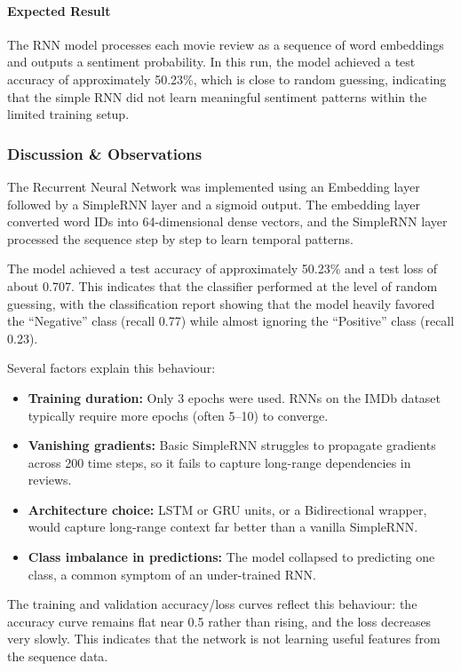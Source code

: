 \documentclass[a4paper,11pt]{article}
\begin{document}
\begin{itemize}
\paragraph{Expected Result}
The RNN model processes each movie review as a sequence of word embeddings and outputs a sentiment probability. In this run, the model achieved a test accuracy of approximately 50.23\%, which is close to random guessing, indicating that the simple RNN did not learn meaningful sentiment patterns within the limited training setup.

\subsubsection{Discussion \& Observations}

The Recurrent Neural Network was implemented using an Embedding layer followed by a SimpleRNN layer and a sigmoid output. The embedding layer converted word IDs into 64-dimensional dense vectors, and the SimpleRNN layer processed the sequence step by step to learn temporal patterns.

The model achieved a test accuracy of approximately 50.23\% and a test loss of about 0.707. This indicates that the classifier performed at the level of random guessing, with the classification report showing that the model heavily favored the ``Negative'' class (recall 0.77) while almost ignoring the ``Positive'' class (recall 0.23).

Several factors explain this behaviour:
\begin{itemize}
    \item \textbf{Training duration:} Only 3 epochs were used. RNNs on the IMDb dataset typically require more epochs (often 5--10) to converge.
    \item \textbf{Vanishing gradients:} Basic SimpleRNN struggles to propagate gradients across 200 time steps, so it fails to capture long-range dependencies in reviews.
    \item \textbf{Architecture choice:} LSTM or GRU units, or a Bidirectional wrapper, would capture long-range context far better than a vanilla SimpleRNN.
    \item \textbf{Class imbalance in predictions:} The model collapsed to predicting one class, a common symptom of an under-trained RNN.
\end{itemize}

The training and validation accuracy/loss curves reflect this behaviour: the accuracy curve remains flat near 0.5 rather than rising, and the loss decreases very slowly. This indicates that the network is not learning useful features from the sequence data.


\end{itemize}
\end{document}
